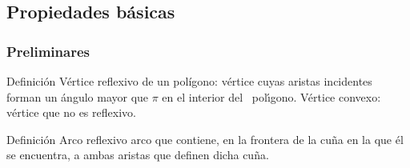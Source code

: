 \documentclass[notes=show]{beamer}
\begin{document}
\subsection{Propiedades b\'asicas}

\begin{frame}
\frametitle{Preliminares}

\begin{block}{Definici\'on}
\alert{V\'{e}rtice reflexivo} de un pol\'igono: v\'{e}rtice cuyas aristas incidentes forman un \'{a}ngulo mayor que $\pi$ en el interior del \ pol\'{\i}gono. V\'ertice convexo: v\'ertice que no es reflexivo.					
\end{block}
\pause
\begin{block}{Definici\'on}
\alert{Arco reflexivo} arco que contiene, en la frontera de la cu\~na en la que \'el se encuentra, a ambas aristas que definen dicha cu\~na.					
\end{block}
\end{frame}
\end{document}
